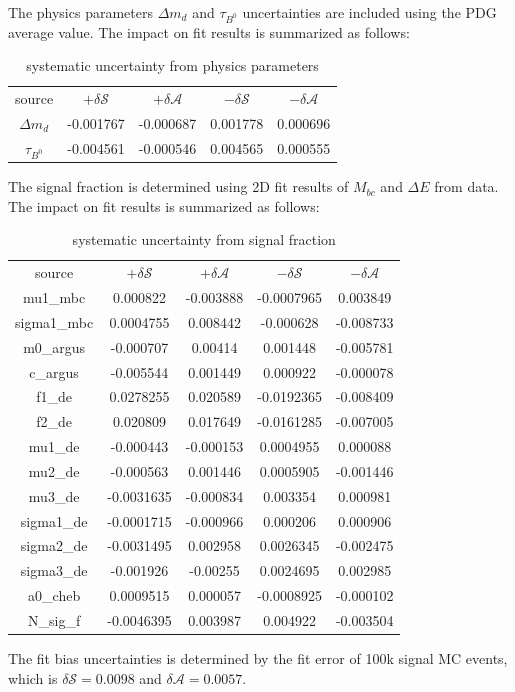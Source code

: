 The physics parameters $\Delta m_d$ and $\tau_{B^0}$ uncertainties are included using the PDG average value. The impact on fit results is summarized as follows: 
\begin{table}[H]
	\begin{minipage}[b]{1.0\linewidth}
		\centering
		\caption{systematic uncertainty from  physics parameters}
		\begin{tabular}{c c c c c}
			\hline
			source & $+\delta \mathcal{S}$ & $+\delta \mathcal{A}$ & $-\delta \mathcal{S}$ &  $-\delta \mathcal{A}$\\
			$\Delta m_d$  & -0.001767
			& -0.000687
			& 0.001778
			& 0.000696
			\\
			$\tau_{B^0}$  & -0.004561
			& -0.000546
			& 0.004565
			& 0.000555
			\\
			\hline
		\end{tabular}
	\end{minipage}
\end{table}
The signal fraction is determined using 2D fit results of $M_{bc}$ and $\Delta E$ from data. The impact on fit results is summarized as follows: 
\begin{table}[H]
	\begin{minipage}[b]{1.0\linewidth}
		\centering
		\caption{systematic uncertainty from  signal fraction}
		\begin{tabular}{c c c c c}
			\hline
			source & $+\delta \mathcal{S}$ & $+\delta \mathcal{A}$ & $-\delta \mathcal{S}$ &  $-\delta \mathcal{A}$\\
			mu1\_mbc  & 0.000822 &	-0.003888&	-0.0007965&	0.003849
			\\
			sigma1\_mbc & 0.0004755&	0.008442&	-0.000628&	-0.008733
			\\
			m0\_argus & -0.000707&	0.00414	&0.001448&	-0.005781
			\\
			c\_argus & -0.005544&	0.001449&	0.000922&	-0.000078\\
			f1\_de & 0.0278255 &	0.020589&	-0.0192365	&-0.008409
			\\
			f2\_de & 0.020809&	0.017649	&-0.0161285	&-0.007005
			\\
			mu1\_de & -0.000443&	-0.000153&	0.0004955&	0.000088\\
			mu2\_de & -0.000563&	0.001446&	0.0005905&	-0.001446
			\\
			mu3\_de & -0.0031635&	-0.000834&	0.003354&	0.000981
			\\
			sigma1\_de& -0.0001715&	-0.000966&	0.000206&	0.000906
			\\
			sigma2\_de& -0.0031495&	0.002958&	0.0026345&	-0.002475
			\\
			sigma3\_de& -0.001926&	-0.00255&	0.0024695&	0.002985
			\\
			a0\_cheb & 0.0009515&	0.000057&	-0.0008925&	-0.000102
			\\
			N\_sig\_f & -0.0046395&	0.003987&	0.004922&	-0.003504
			\\
			\hline
		\end{tabular}
	\end{minipage}
\end{table}
The fit bias uncertainties is determined by the fit error of 100k signal MC events, which is $\delta {\mathcal{S}}=0.0098$ and $\delta {\mathcal{A}}=0.0057$.


